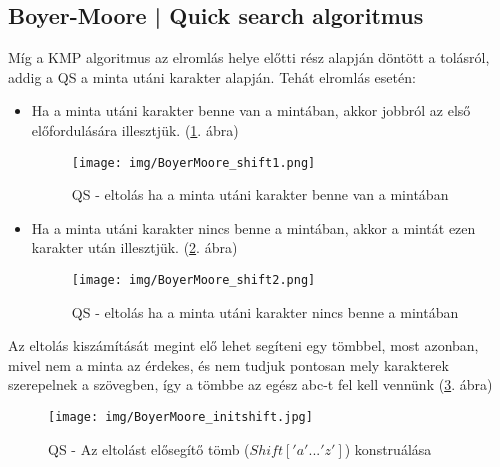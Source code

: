\documentclass[margin=0px]{article}
\begin{document}
\subsection{Boyer-Moore  | Quick search algoritmus}
Míg a KMP algoritmus az elromlás helye előtti rész alapján döntött a tolásról, addig a QS a minta utáni karakter alapján. Tehát elromlás esetén:
\begin{itemize}
    \item Ha a minta utáni karakter benne van a mintában, akkor jobbról az első előfordulására illesztjük. (\ref{fig:BoyerMoore_shift1}. ábra)
          \begin{figure}[H]
              \centering
              \texttt{[image: img/BoyerMoore\_shift1.png]}
              \caption{QS - eltolás ha a minta utáni karakter benne van a mintában}
              \label{fig:BoyerMoore_shift1}
          \end{figure}
    \item Ha a minta utáni karakter nincs benne a mintában, akkor a mintát ezen karakter után illesztjük. (\ref{fig:BoyerMoore_shift2}. ábra)
          \begin{figure}[H]
              \centering
              \texttt{[image: img/BoyerMoore\_shift2.png]}
              \caption{QS - eltolás ha a minta utáni karakter nincs benne a mintában}
              \label{fig:BoyerMoore_shift2}
          \end{figure}
\end{itemize}

Az eltolás kiszámítását megint elő lehet segíteni egy tömbbel, most azonban, mivel nem a minta az érdekes, és nem tudjuk pontosan mely karakterek szerepelnek a szövegben, így a tömbbe az egész abc-t fel kell vennünk (\ref{fig:BoyerMoore_initshift}. ábra)

\begin{figure}[H]
    \centering
    \texttt{[image: img/BoyerMoore\_initshift.jpg]}
    \caption{QS - Az eltolást elősegítő tömb ($Shift['a'...'z']$) konstruálása}
    \label{fig:BoyerMoore_initshift}
\end{figure}
\end{document}
